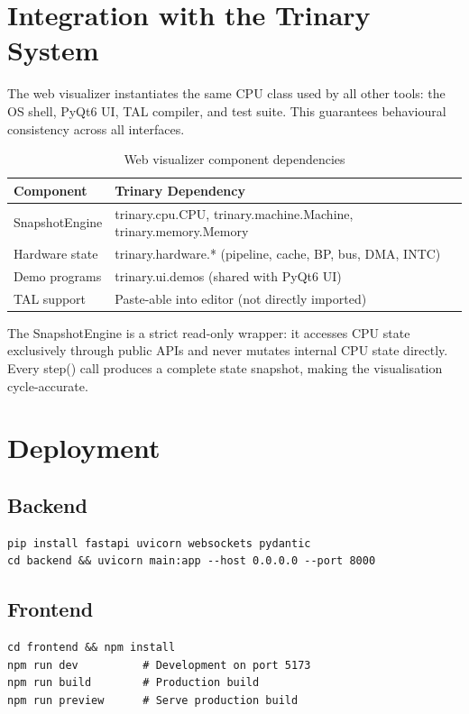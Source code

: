 \documentclass[12pt,a4paper,twoside]{book}
\theoremstyle{trinarytheorem}
\theoremstyle{trinarydefinition}
\newcommand{\code}[1]{\textsf{#1}}
\begin{document}
\section{Integration with the Trinary System}

The web visualizer instantiates the same \code{CPU} class used by all
other tools: the OS shell, PyQt6 UI, TAL compiler, and test suite. This
guarantees behavioural consistency across all interfaces.

\begin{table}[H]
\centering
\caption{Web visualizer component dependencies}
\label{tab:webdepts}
\begin{tabular}{ll}
\toprule
Component & Trinary Dependency \\
\midrule
SnapshotEngine & \code{trinary.cpu.CPU}, \code{trinary.machine.Machine}, \code{trinary.memory.Memory} \\
Hardware state & \code{trinary.hardware.*} (pipeline, cache, BP, bus, DMA, INTC) \\
Demo programs & \code{trinary.ui.demos} (shared with PyQt6 UI) \\
TAL support & Paste-able into editor (not directly imported) \\
\bottomrule
\end{tabular}
\end{table}

The \code{SnapshotEngine} is a strict read-only wrapper: it accesses
CPU state exclusively through public APIs and never mutates internal CPU
state directly. Every \code{step()} call produces a complete state
snapshot, making the visualisation cycle-accurate.

\section{Deployment}

\subsection{Backend}
\begin{verbatim}
pip install fastapi uvicorn websockets pydantic
cd backend && uvicorn main:app --host 0.0.0.0 --port 8000
\end{verbatim}

\subsection{Frontend}
\begin{verbatim}
cd frontend && npm install
npm run dev          # Development on port 5173
npm run build        # Production build
npm run preview      # Serve production build
\end{verbatim}
\end{document}

